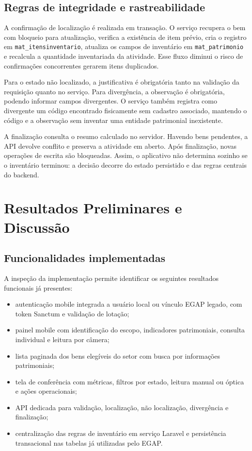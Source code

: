 \documentclass[12pt,a4paper]{article}
\begin{document}
\subsection{Regras de integridade e rastreabilidade}

A confirmação de localização é realizada em transação. O serviço recupera o
bem com bloqueio para atualização, verifica a existência de item prévio, cria
o registro em \texttt{mat\_itensinventario}, atualiza os campos de inventário
em \texttt{mat\_patrimonio} e recalcula a quantidade inventariada da
atividade. Esse fluxo diminui o risco de confirmações concorrentes gerarem
itens duplicados.

Para o estado não localizado, a justificativa é obrigatória tanto na validação
da requisição quanto no serviço. Para divergência, a observação é obrigatória,
podendo informar campos divergentes. O serviço também registra como divergente
um código encontrado fisicamente sem cadastro associado, mantendo o código e a
observação sem inventar uma entidade patrimonial inexistente.

A finalização consulta o resumo calculado no servidor. Havendo bens pendentes,
a API devolve conflito e preserva a atividade em aberto. Após finalização,
novas operações de escrita são bloqueadas. Assim, o aplicativo não determina
sozinho se o inventário terminou: a decisão decorre do estado persistido e das
regras centrais do backend.

\section{Resultados Preliminares e Discussão}

\subsection{Funcionalidades implementadas}

A inspeção da implementação permite identificar os seguintes resultados
funcionais já presentes:

\begin{itemize}
  \item autenticação mobile integrada a usuário local ou vínculo EGAP legado,
  com token Sanctum e validação de lotação;
  \item painel mobile com identificação do escopo, indicadores patrimoniais,
  consulta individual e leitura por câmera;
  \item lista paginada dos bens elegíveis do setor com busca por informações
  patrimoniais;
  \item tela de conferência com métricas, filtros por estado, leitura manual ou
  óptica e ações operacionais;
  \item API dedicada para validação, localização, não localização,
  divergência e finalização;
  \item centralização das regras de inventário em serviço Laravel e persistência
  transacional nas tabelas já utilizadas pelo EGAP.
\end{itemize}
\end{document}

